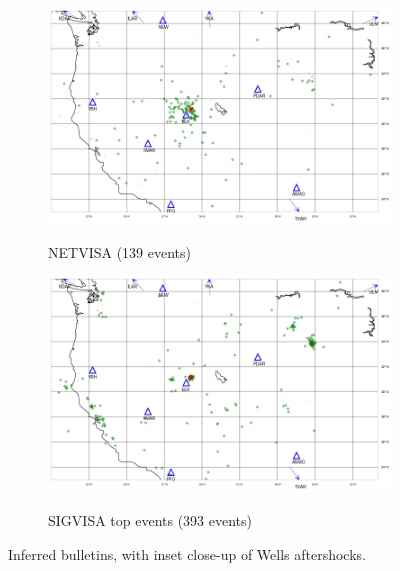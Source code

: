 \documentclass[twoside]{article} \usepackage{aistats2017}
\begin{document}
\begin{figure}
\centering
\begin{subfigure}[b]{0.45\textwidth}
  {\includegraphics[width=\textwidth]{visa_map}}
\caption{NETVISA (139 events)}
\label{fig:visa_map}
\end{subfigure}
\begin{subfigure}[b]{0.45\textwidth}
  {\includegraphics[width=\textwidth]{sigvisa_top_map}}
\caption{SIGVISA top events (393 events)}
\label{fig:sigvisa_map}
\end{subfigure}

\caption{Inferred bulletins, with inset close-up of Wells aftershocks.}
\label{fig:inferred_map}
\end{figure}
\end{document}
